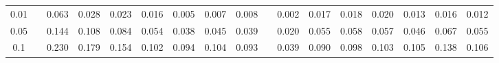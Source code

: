 % 
\begin{tabular}{ccccccccccccccccc}
  \hline
  \hline
0.01 &  & 0.063 & 0.028 & 0.023 & 0.016 & 0.005 & 0.007 & 0.008 &  & 0.002 & 0.017 & 0.018 & 0.020 & 0.013 & 0.016 & 0.012 \\ 
  0.05 &  & 0.144 & 0.108 & 0.084 & 0.054 & 0.038 & 0.045 & 0.039 &  & 0.020 & 0.055 & 0.058 & 0.057 & 0.046 & 0.067 & 0.055 \\ 
  0.1 &  & 0.230 & 0.179 & 0.154 & 0.102 & 0.094 & 0.104 & 0.093 &  & 0.039 & 0.090 & 0.098 & 0.103 & 0.105 & 0.138 & 0.106 \\ 
   \hline
\end{tabular}
